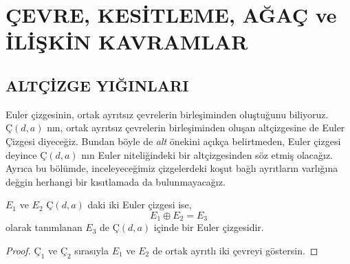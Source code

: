 \documentclass[11pt]{amsbook}
\begin{document}
\section{ÇEVRE, KESİTLEME, AĞAÇ ve İLİŞKİN KAVRAMLAR}

\subsection{ALTÇİZGE YIĞINLARI}

Euler çizgesinin, ortak ayrıtsız çevrelerin birleşiminden oluştuğunu biliyoruz. 
$Ç(d, a)$ nın, ortak ayrıtsız çevrelerin birleşiminden oluşan altçizgesine de Euler Çizgesi diyeceğiz.
Bundan böyle de \emph{alt} önekini açıkça belirtmeden,
Euler çizgesi deyince $Ç(d, a)$ nın Euler niteliğindeki bir altçizgesinden söz etmiş olacağız. 
Ayrıca bu bölümde, inceleyeceğimiz çizgelerdeki koşut bağlı ayrıtların varlığına 
değgin herhangi bir kısıtlamada da bulunmayacağız.
\begin{theorem}
	$E_1$ ve $E_2$ $Ç(d, a)$ daki iki Euler çizgesi ise,
	\[
		E_1 \oplus E_2 = E_3
	\]
	olarak tanımlanan $E_3$ de $Ç(d, a)$ içinde bir Euler çizgesidir.
\end{theorem}
\begin{proof}
	$Ç_1$ ve $Ç_2$ sırasıyla $E_1$ ve $E_2$ de ortak ayrıtlı iki çevreyi göstersin.
\end{proof}
\end{document}
